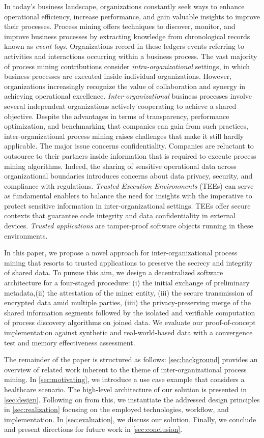 In today's business landscape, organizations constantly seek ways to enhance operational efficiency, increase performance, and gain valuable insights to improve their processes. Process mining offers techniques to discover, monitor, and improve business processes by extracting knowledge from chronological records known as \textit{event logs}. Organizations record in these ledgers events referring to activities and interactions occurring within a business process. The vast majority of process mining contributions consider \textit{intra-organizational} settings, in which business processes are executed inside individual organizations. However, organizations increasingly recognize the value of collaboration and synergy in achieving operational excellence. \textit{Inter-organizational} business processes involve several independent organizations actively cooperating to achieve a shared objective. Despite the advantages in terms of transparency, performance optimization, and benchmarking that companies can gain from such practices, inter-organizational process mining raises challenges that make it still hardly applicable. The major issue concerns confidentiality. Companies are reluctant to outsource to their partners inside information that is required to execute process mining algorithms. Indeed, the sharing of sensitive operational data across organizational boundaries introduces concerns about data privacy, security, and compliance with regulations. \textit{Trusted Execution Environments} (TEEs) can serve as fundamental enablers to balance the need for insights with the imperative to protect sensitive information in inter-organizational settings. TEEs offer secure contexts that guarantee code integrity and data confidentiality in external devices. \textit{Trusted applications} are tamper-proof software objects running in these environments. 

In this paper, we propose a novel approach for inter-organizational process mining that resorts to trusted applications to preserve the secrecy and integrity of shared data. To pursue this aim, we design a decentralized software architecture for a four-staged procedure: (i) the initial exchange of preliminary metadata,(ii) the attestation of the miner entity, (iii) the secure transmission of encrypted data amid multiple parties, (iiii) the privacy-preserving merge of the shared information segments followed by the isolated and verifiable computation of process discovery algorithms on joined data.
We evaluate our proof-of-concept implementation against synthetic and real-world-based data with a convergence test and memory effectiveness assessment.

The remainder of the paper is structured as follows: \cref{sec:background} provides an overview of related work inherent to the theme of inter-organizational process mining. In \cref{sec:motivating}, we introduce a use case example that considers a healthcare scenario. The high-level architecture of our solution is presented in \cref{sec:design}. Following on from this, we instantiate the addressed design principles in \cref{sec:realization} focusing on the employed technologies, workflow, and implementation. In \cref{sec:evaluation}, we discuss our solution. Finally, we conclude and present directions for future work in \cref{sec:conclusion}.
